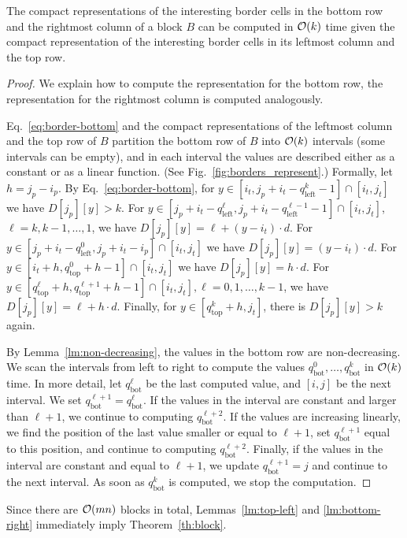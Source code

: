 \begin{lemma}\label{lm:bottom-right}
The compact representations of the interesting border cells in the bottom row and the rightmost column of a block $B$ can be computed in $\mathcal{O}(k)$ time given the compact representation of the interesting border cells in its leftmost column and the top row.
\end{lemma}
\begin{proof}
We explain how to compute the representation for the bottom row, the representation for the rightmost column is computed analogously. 

Eq.~\ref{eq:border-bottom} and the compact representations of the leftmost column and the top row of $B$ partition the bottom row of $B$ into $\mathcal{O}(k)$ intervals (some intervals can be empty), and in each interval the values are described either as a constant or as a linear function. (See Fig.~\ref{fig:borders_represent}.) Formally, let $h=j_p-i_p$. By Eq.~\ref{eq:border-bottom}, for $y \in [i_t,  j_p+i_t-q^{k}_{\text{left}}-1] \cap [i_t,j_t]$ we have $D[j_p][y] > k$. For $y \in [j_p+i_t-q^\ell_\text{left}, j_p+i_t-q^{\ell-1}_\text{left}-1]  \cap [i_t,j_t]$, $\ell = k, k-1, \ldots, 1$, we have 
$D[j_p][y] = \ell + (y-i_t) \cdot d$. For $y \in [j_p+i_t-q^0_\text{left}, j_p+i_t-i_p] \cap [i_t,j_t]$ we have $D[j_p][y] = (y-i_t) \cdot d$. For $y \in [i_t+h, q_{\text{top}}^{0}+h-1] \cap [i_t,j_t]$ we have $D[j_p][y] = h \cdot d$. For $y \in [q_{\text{top}}^{\ell}+h,q_{\text{top}}^{\ell+1}+h-1] \cap [i_t,j_t], \ell = 0, 1, \ldots, k-1$, we have $D[j_p][y] = \ell + h \cdot d$. Finally, for $y \in [q_{\text{top}}^{k}+h, j_t]$, there is $D[j_p][y] > k$ again. 


By Lemma~\ref{lm:non-decreasing}, the values in the bottom row are non-decreasing. We scan the intervals from left to right to compute the values $q_{\text{bot}}^0, \ldots, q_{\text{bot}}^k$ in $\mathcal{O}(k)$ time. In more detail, let $q_{\text{bot}}^\ell$ be the last computed value, and $[i,j]$ be the next interval. We set $q_{\text{bot}}^{\ell+1} = q_{\text{bot}}^{\ell}$. If the values in the interval are constant and larger than $\ell+1$, we continue to computing $q_{\text{bot}}^{\ell+2}$. If the values are increasing linearly, we find the position of the last value smaller or equal to $\ell+1$, set $q_{\text{bot}}^{\ell+1}$ equal to this position, and continue to computing $q_{\text{bot}}^{\ell+2}$. Finally, if the values in the interval are constant and equal to $\ell+1$, we update $q_{\text{bot}}^{\ell+1} = j$ and continue to the next interval. As soon as $q_{\text{bot}}^k$ is computed, we stop the computation. 
\end{proof}

Since there are $\mathcal{O}(mn)$ blocks in total, Lemmas~\ref{lm:top-left} and  \ref{lm:bottom-right} immediately imply Theorem~\ref{th:block}.




